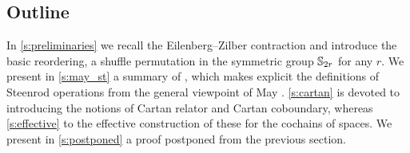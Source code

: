 
\subsection*{Outline}

In \cref{s:preliminaries} we recall the Eilenberg--Zilber contraction and introduce the basic reordering, a shuffle permutation in the symmetric group $\mathbb{S}_{2r}$ for any $r$.
We present in \cref{s:may_st} a summary of \cite{medina2021may_st}, which makes explicit the definitions of Steenrod operations \cite{steenrod1953cyclic} from the general viewpoint of May \cite{may1970general}.
\cref{s:cartan} is devoted to introducing the notions of Cartan relator and Cartan coboundary, whereas \cref{s:effective} to the effective construction of these for the cochains of spaces.
We present in \cref{s:postponed} a proof postponed from the previous section.